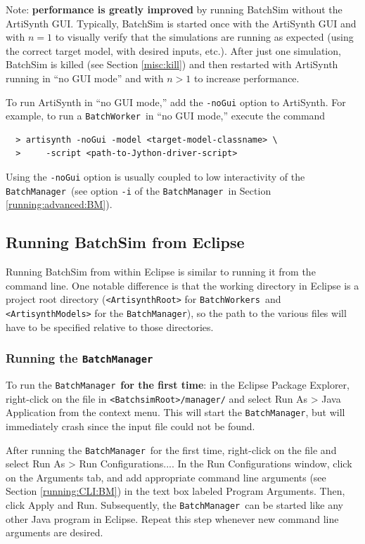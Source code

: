 \documentclass{article}
\newcommand{\AS}{<ArtisynthRoot>}
\newcommand{\AM}{<ArtisynthModels>}
\newcommand{\BS}{<BatchsimRoot>}
\newcommand{\BM}{{\tt BatchManager}}
\newcommand{\BW}{{\tt BatchWorker}}
\newcommand{\BWs}{{\tt BatchWorkers}}
\begin{document}
\begin{sideblock}
Note: \textbf{performance is greatly improved} by running BatchSim without the ArtiSynth GUI. Typically, BatchSim is started once with the ArtiSynth GUI and with $n = 1$ to visually verify that the simulations are running as expected (using the correct target model, with desired inputs, etc.). After just one simulation, BatchSim is killed (see Section \ref{misc:kill}) and then restarted with ArtiSynth running in ``no GUI mode'' and with $n > 1$ to increase performance.

To run ArtiSynth in ``no GUI mode,'' add the {\tt -noGui} option to ArtiSynth. For example, to run a \BW\ in ``no GUI mode,'' execute the command
\begin{verbatim}
  > artisynth -noGui -model <target-model-classname> \
  >     -script <path-to-Jython-driver-script>
\end{verbatim}

Using the {\tt -noGui} option is usually coupled to low interactivity of the \BM\ (see option {\tt -i} of the \BM\ in Section \ref{running:advanced:BM}).
\end{sideblock}

\subsection{Running BatchSim from Eclipse}
\label{running:eclipse}

Running BatchSim from within Eclipse is similar to running it from the command line. One notable difference is that the working directory in Eclipse is a project root directory ({\tt \AS} for \BWs\ and {\tt \AM} for the \BM), so the path to the various files will have to be specified relative to those directories.

\subsubsection{Running the \BM}

To run the \BM\ \textbf{for the first time}: in the Eclipse {\sf Package Explorer}, right-click on the  file in {\tt \BS/manager/} and select {\sf Run As > Java Application} from the context menu. This will start the \BM, but will immediately crash since the input file could not be found.

After running the \BM\ for the first time, right-click on the  file and select {\sf Run As > Run Configurations...}. In the {\sf Run Configurations} window, click on the {\sf Arguments} tab, and add appropriate command line arguments (see Section \ref{running:CLI:BM}) in the text box labeled {\sf Program Arguments}. Then, click {\sf Apply} and {\sf Run}. Subsequently, the \BM\ can be started like any other Java program in Eclipse. Repeat this step whenever new command line arguments are desired.
\end{document}
